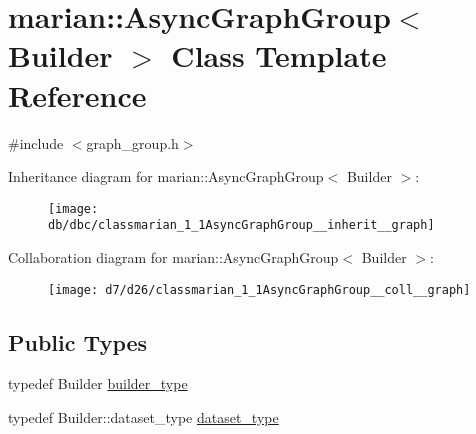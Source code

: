 \hypertarget{classmarian_1_1AsyncGraphGroup}{}\section{marian\+:\+:Async\+Graph\+Group$<$ Builder $>$ Class Template Reference}
\label{classmarian_1_1AsyncGraphGroup}


{\ttfamily \#include $<$graph\+\_\+group.\+h$>$}



Inheritance diagram for marian\+:\+:Async\+Graph\+Group$<$ Builder $>$\+:
\nopagebreak
\begin{figure}[H]
\begin{center}
\leavevmode
\texttt{[image: db/dbc/classmarian\_1\_1AsyncGraphGroup\_\_inherit\_\_graph]}
\end{center}
\end{figure}


Collaboration diagram for marian\+:\+:Async\+Graph\+Group$<$ Builder $>$\+:
\nopagebreak
\begin{figure}[H]
\begin{center}
\leavevmode
\texttt{[image: d7/d26/classmarian\_1\_1AsyncGraphGroup\_\_coll\_\_graph]}
\end{center}
\end{figure}
\subsection*{Public Types}
\begin{DoxyCompactItemize}
\item 
typedef Builder \hyperlink{classmarian_1_1AsyncGraphGroup_a1e7d2c68e66fd37bde89d5cf340ccc7a}{builder\+\_\+type}
\item 
typedef Builder\+::dataset\+\_\+type \hyperlink{classmarian_1_1AsyncGraphGroup_a94dd3794d340f8912f60a2c921a0dbf7}{dataset\+\_\+type}
\end{DoxyCompactItemize}
